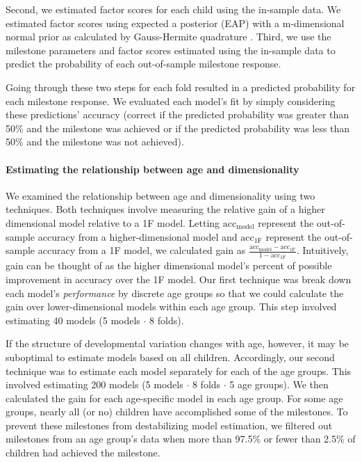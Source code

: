\documentclass[man, floatsintext]{apa7}
\begin{document}
Second, we estimated factor scores for each child using the in-sample
data. We estimated factor scores using expected a posterior (EAP) with a
m-dimensional normal prior as calculated by Gauss-Hermite quadrature
\parencite{embretson2013}. Third, we use the milestone parameters and factor scores estimated
using the in-sample data to predict the probability of each
out-of-sample milestone response.

Going through these two steps for each fold resulted in a predicted
probability for each milestone response. We evaluated each model's fit
by simply considering these predictions' accuracy (correct if the
predicted probability was greater than 50\% and the milestone was
achieved or if the predicted probability was less than 50\% and the
milestone was not achieved).

\paragraph{Estimating the relationship between age and dimensionality}

We examined the relationship between age and dimensionality using two
techniques. Both techniques involve measuring the relative gain of a
higher dimensional model relative to a 1F model. Letting
$\text{acc}_\text{model}$ represent the out-of-sample accuracy from a
higher-dimensional model and $\text{acc}_\text{1F}$ represent the
out-of-sample accuracy from a 1F model, we calculated gain as
$\frac{\text{acc}_\text{model} - \text{acc}_\text{1F}}{1 - \text{acc}_\text{1F}}$.
Intuitively, gain can be thought of as the higher dimensional model's
percent of possible improvement in accuracy over the 1F model. Our first
technique was break down each model's \emph{performance} by discrete age groups so that
we could calculate the gain over lower-dimensional models within each age group. 
This step involved estimating 40 models (5 models $\cdot$ 8 folds). 

If the structure of developmental variation changes with age, however, it may be suboptimal to
estimate models based on all children. Accordingly, our second technique
was to estimate each model separately for each of the age groups. This
involved estimating 200 models
(5 models $\cdot$ 8 folds $\cdot$ 5 age groups).
We then calculated the gain for each age-specific model in each age group. For some
age groups, nearly all (or no) children have accomplished some of the
milestones. To prevent these milestones from destabilizing model
estimation, we filtered out milestones from an age group's data when
more than 97.5\% or fewer than 2.5\% of children had achieved the
milestone. 
\end{document}
